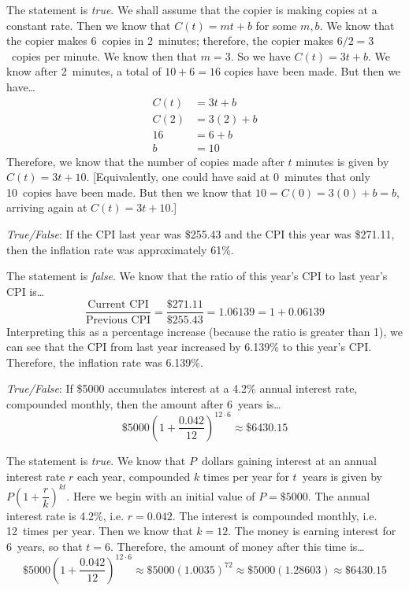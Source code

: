 \documentclass[11pt,letterpaper]{article}
\begin{document}
\sol The statement is \textit{true}. We shall assume that the copier is making copies at a constant rate. Then we know that $C(t)= mt + b$ for some $m, b$. We know that the copier makes 6~copies in 2~minutes; therefore, the copier makes $6/2= 3$~copies per minute. We know then that $m= 3$. So we have $C(t)= 3t + b$. We know after 2~minutes, a total of $10 + 6= 16$ copies have been made. But then we have\dots
	\[
	\begin{aligned}
	C(t)&= 3t + b \\[0.3cm]
	C(2)&= 3(2) + b \\[0.3cm]
	16&= 6 + b \\[0.3cm]
	b&= 10
	\end{aligned}
	\]
Therefore, we know that the number of copies made after $t$ minutes is given by $C(t)= 3t + 10$. [Equivalently, one could have said at 0~minutes that only 10~copies have been made. But then we know that $10= C(0)= 3(0) + b= b$, arriving again at $C(t)= 3t + 10$.] \pvspace{1.5cm}



\quizsol \textit{True/False}: If the CPI last year was \$255.43 and the CPI this year was \$271.11, then the inflation rate was approximately 61\%. \pspace

\sol The statement is \textit{false}. We know that the ratio of this year's CPI to last year's CPI is\dots
	\[
	\dfrac{\text{Current CPI}}{\text{Previous CPI}}= \dfrac{\$271.11}{\$255.43}= 1.06139= 1 + 0.06139
	\]
Interpreting this as a percentage increase (because the ratio is greater than 1), we can see that the CPI from last year increased by 6.139\% to this year's CPI. Therefore, the inflation rate was 6.139\%. \pvspace{1.5cm}



\quizsol \textit{True/False}: If \$5000 accumulates interest at a 4.2\% annual interest rate, compounded monthly, then the amount after 6~years is\dots
	\[
	\$5000 \left(1 + \dfrac{0.042}{12} \right)^{12 \cdot 6} \approx \$6430.15
	\] \pspace



\newpage



\sol The statement is \textit{true}. We know that $P$~dollars gaining interest at an annual interest rate $r$ each year, compounded $k$ times per year for $t$~years is given by $P \left(1 + \dfrac{r}{k} \right)^{kt}$. Here we begin with an initial value of $P= \$5000$. The annual interest rate is 4.2\%, i.e. $r= 0.042$. The interest is compounded monthly, i.e. 12~times per year. Then we know that $k= 12$. The money is earning interest for 6~years, so that $t= 6$. Therefore, the amount of money after this time is\dots
	\[
	\$5000 \left(1 + \dfrac{0.042}{12} \right)^{12 \cdot 6} \approx \$5000 (1.0035)^{72} \approx \$5000(1.28603) \approx \$6430.15
	\] \pvspace{1.5cm}
\end{document}
